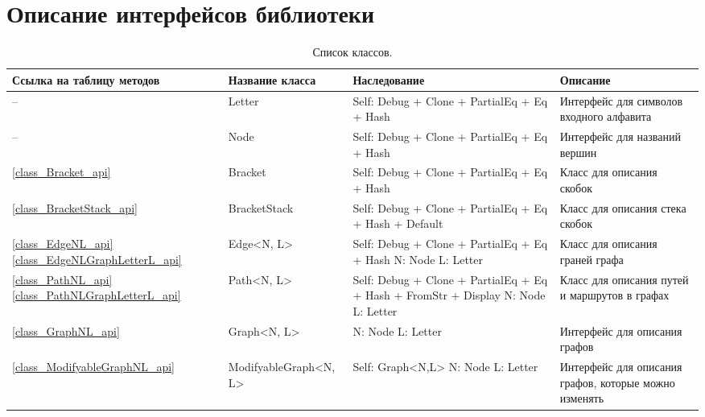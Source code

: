 
\appendix
\chapter{Описание интерфейсов библиотеки} \label{AppendixA}

\begin{longtable}[c]{|m{4em}|m{9em}|m{10em}|m{10em}|}
    \caption{Список классов.\label{all_class_table}}\\

    \hline
        \textbf{Ссылка на таблицу методов} & \textbf{Название класса} & \textbf{Наследование} & \textbf{Описание}\\
    \hline
        -- & Letter & Self: Debug + Clone + PartialEq + Eq + Hash & Интерфейс для символов входного алфавита \\
    \hline
        -- & Node & Self: Debug + Clone + PartialEq + Eq + Hash  & Интерфейс для названий вершин \\
    \hline
        \ref{class_Bracket_api} & Bracket & Self: Debug + Clone + PartialEq + Eq + Hash  & Класс для описания скобок \\
    \hline
        \ref{class_BracketStack_api} & BracketStack & Self: Debug + Clone + PartialEq + Eq + Hash + Default & Класс для описания стека скобок \\
    \hline
        \ref{class_EdgeNL_api} \newline \ref{class_EdgeNLGraphLetterL_api} & Edge<N, L> & Self: Debug + Clone + PartialEq + Eq + Hash \newline N: Node \newline  L: Letter & Класс для описания граней графа \\
    \hline
        \ref{class_PathNL_api} \newline \ref{class_PathNLGraphLetterL_api} & Path<N, L> & Self: Debug + Clone + PartialEq + Eq + Hash + FromStr + Display \newline N: Node \newline L: Letter & Класс для описания путей и маршрутов в графах \\
    \hline
        \ref{class_GraphNL_api} & Graph<N, L> & N: Node \newline L: Letter & Интерфейс для описания графов \\
    \hline
        \ref{class_ModifyableGraphNL_api} & ModifyableGraph<N, L> & Self: Graph<N,L> \newline N: Node \newline L: Letter & Интерфейс для описания графов, которые можно изменять \\

\end{longtable}
